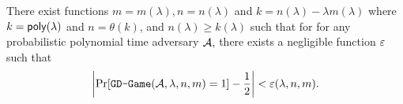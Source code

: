 \begin{assumption}\label{ass:GoppaRandom}
There exist functions $m = m (\lambda), n = n(\lambda)$ and $k = n(\lambda) - \lambda m(\lambda)$ where $k = \mathsf{poly}(\lambda)$ and $n = \theta(k)$, and $n(\lambda) \geq k(\lambda)$ such that for
for any probabilistic polynomial time adversary $\mathcal{A},$ there exists a negligible function $\varepsilon$ such that
\[\left|\Pr [\texttt{GD-Game}(\mathcal{A},\lambda,n,m) = 1] - \frac{1}{2}\right| < \varepsilon(\lambda,n,m). \]
\end{assumption}